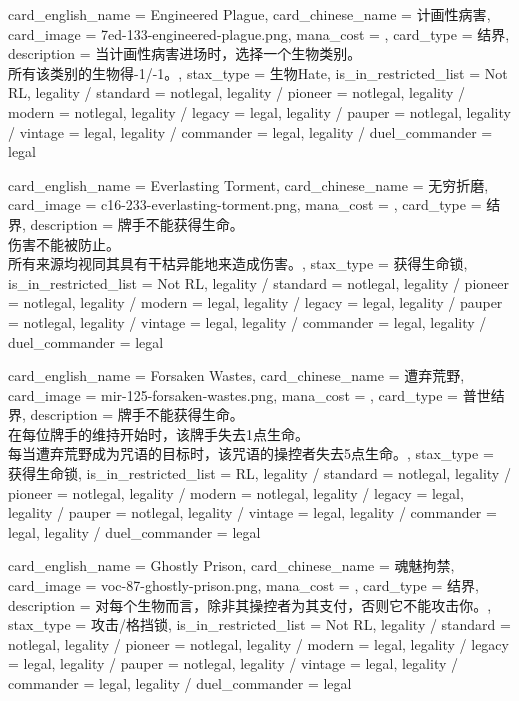 \documentclass[lang = cn, color = black, 10pt]{AllThatStax}
\begin{document}
\card
{
	card_english_name = {Engineered Plague},
	card_chinese_name = {计画性病害},
	card_image = 7ed-133-engineered-plague.png,
	mana_cost = ,
	card_type = 结界,
	description = {当计画性病害进场时，选择一个生物类别。\\
所有该类别的生物得-1/-1。},
	stax_type = 生物Hate,
	is_in_restricted_list = Not RL,
	legality / standard = notlegal,
	legality / pioneer = notlegal,
	legality / modern = notlegal,
	legality / legacy = legal,
	legality / pauper = notlegal,
	legality / vintage = legal,
	legality / commander = legal,
	legality / duel_commander = legal
}

\card
{
	card_english_name = {Everlasting Torment},
	card_chinese_name = {无穷折磨},
	card_image = c16-233-everlasting-torment.png,
	mana_cost = ,
	card_type = 结界,
	description = {牌手不能获得生命。\\
伤害不能被防止。\\
所有来源均视同其具有干枯异能地来造成伤害。},
	stax_type = 获得生命锁,
	is_in_restricted_list = Not RL,
	legality / standard = notlegal,
	legality / pioneer = notlegal,
	legality / modern = legal,
	legality / legacy = legal,
	legality / pauper = notlegal,
	legality / vintage = legal,
	legality / commander = legal,
	legality / duel_commander = legal
}

\card
{
	card_english_name = {Forsaken Wastes},
	card_chinese_name = {遭弃荒野},
	card_image = mir-125-forsaken-wastes.png,
	mana_cost = ,
	card_type = 普世结界,
	description = {牌手不能获得生命。\\
在每位牌手的维持开始时，该牌手失去1点生命。\\
每当遭弃荒野成为咒语的目标时，该咒语的操控者失去5点生命。},
	stax_type = 获得生命锁,
	is_in_restricted_list = RL,
	legality / standard = notlegal,
	legality / pioneer = notlegal,
	legality / modern = notlegal,
	legality / legacy = legal,
	legality / pauper = notlegal,
	legality / vintage = legal,
	legality / commander = legal,
	legality / duel_commander = legal
}

\card
{
	card_english_name = {Ghostly Prison},
	card_chinese_name = {魂魅拘禁},
	card_image = voc-87-ghostly-prison.png,
	mana_cost = ,
	card_type = 结界,
	description = {对每个生物而言，除非其操控者为其支付，否则它不能攻击你。},
	stax_type = 攻击/格挡锁,
	is_in_restricted_list = Not RL,
	legality / standard = notlegal,
	legality / pioneer = notlegal,
	legality / modern = legal,
	legality / legacy = legal,
	legality / pauper = notlegal,
	legality / vintage = legal,
	legality / commander = legal,
	legality / duel_commander = legal
}
\end{document}
